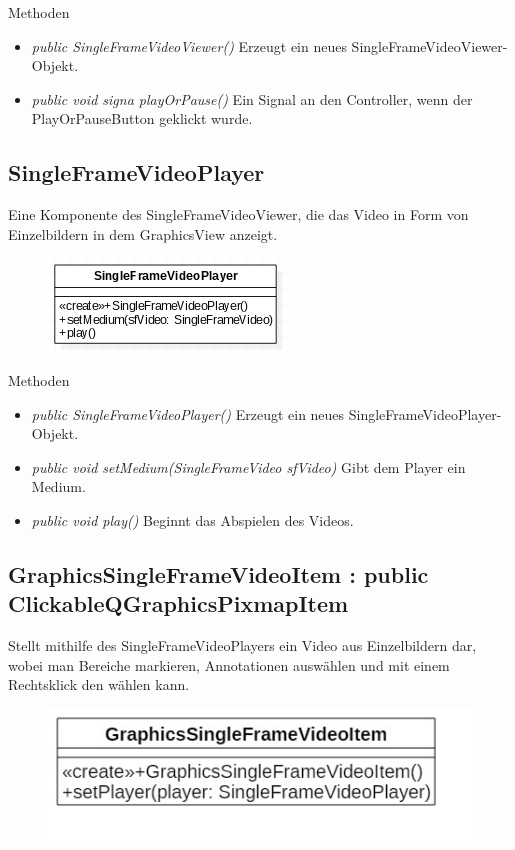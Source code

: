 Methoden
\begin{itemize}
	\item\textit{public SingleFrameVideoViewer()} 
	Erzeugt ein neues SingleFrameVideoViewer-Objekt.
	\item\textit{public void signa playOrPause()} 
	Ein Signal an den Controller, wenn der PlayOrPauseButton geklickt wurde.
\end{itemize} 

\subsection*{SingleFrameVideoPlayer} 
Eine Komponente des SingleFrameVideoViewer, die das Video in Form von Einzelbildern in dem GraphicsView anzeigt.

\begin{figure}[H]
	\centering
	\includegraphics[scale=0.5]{img/Klassendiagramm/Klassen/View/SingleFrameVideoPlayer}
	\label{fig:singleFrameVideoPlayer}
\end{figure}

Methoden
\begin{itemize}
	\item\textit{public SingleFrameVideoPlayer()} 
	Erzeugt ein neues SingleFrameVideoPlayer-Objekt.
	\item\textit{public void setMedium(SingleFrameVideo sfVideo)} 
	Gibt dem Player ein Medium.
	\item\textit{public void play()} 
	Beginnt das Abspielen des Videos.
\end{itemize}

\subsection*{GraphicsSingleFrameVideoItem : public ClickableQGraphicsPixmapItem}
Stellt mithilfe des SingleFrameVideoPlayers ein Video aus Einzelbildern dar, wobei man Bereiche markieren, Annotationen auswählen und mit einem Rechtsklick den  wählen kann.

\begin{figure}[H]
	\centering
	\includegraphics[scale=0.5]{img/Klassendiagramm/Klassen/View/GraphicsSingleFrameVideoItem}
	\label{fig:graphicsSingleFrameVideoItem}
\end{figure}

